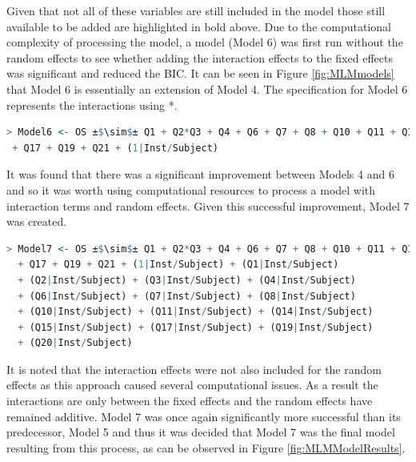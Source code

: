 \documentclass[11pt,a4paper]{report}
\begin{document}
Given that not all of these variables are still included in the model those still available to be added are highlighted in bold above. Due to the computational complexity of processing the model, a model (Model 6) was first run without the random effects to see whether adding the interaction effects to the fixed effects was significant and reduced the BIC. It can be seen in Figure \ref{fig:MLMmodels} that Model 6 is essentially an extension of Model 4. The specification for Model 6 represents the interactions using *. 

{\footnotesize
\begin{lstlisting}[backgroundcolor = \color{light-gray}, language=R, escapechar=±]
> Model6 <- OS ±$\sim$± Q1 + Q2*Q3 + Q4 + Q6 + Q7 + Q8 + Q10 + Q11 + Q14*Q15
 + Q17 + Q19 + Q21 + (1|Inst/Subject)
\end{lstlisting}
}

It was found that there was a significant improvement between Models 4 and 6 and so it was worth using computational resources to process a model with interaction terms and random effects. Given this successful improvement, Model 7 was created. 

{\footnotesize 
\begin{lstlisting}[backgroundcolor = \color{light-gray}, language=R, escapechar=±]
 > Model7 <- OS ±$\sim$± Q1 + Q2*Q3 + Q4 + Q6 + Q7 + Q8 + Q10 + Q11 + Q14*Q15
  + Q17 + Q19 + Q21 + (1|Inst/Subject) + (Q1|Inst/Subject)
  + (Q2|Inst/Subject) + (Q3|Inst/Subject) + (Q4|Inst/Subject) 
  + (Q6|Inst/Subject) + (Q7|Inst/Subject) + (Q8|Inst/Subject)
  + (Q10|Inst/Subject) + (Q11|Inst/Subject) + (Q14|Inst/Subject)
  + (Q15|Inst/Subject) + (Q17|Inst/Subject) + (Q19|Inst/Subject)
  + (Q20|Inst/Subject)
\end{lstlisting}
}

It is noted that the interaction effects were not also included for the random effects as this approach caused several computational issues. As a result the interactions are only between the fixed effects and the random effects have remained additive. Model 7 was once again significantly more successful than its predecessor, Model 5 and thus it was decided that Model 7 was the final model resulting from this process, as can be observed in Figure \ref{fig:MLMModelResults}. 
\end{document}
